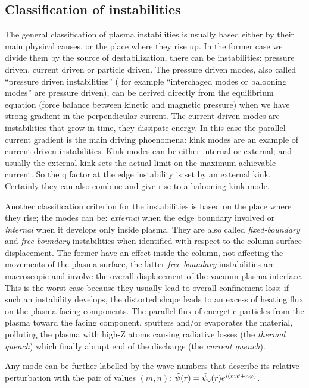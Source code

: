 \subsection{Classification of instabilities}
\label{sez:classificazione}

The general classification of plasma instabilities is usually based either by their main physical causes, or the place where they rise up.
%
In the former case we divide them by the source of destabilization, there can be instabilities: pressure driven, current driven or particle driven. 
The pressure driven modes, also called “pressure driven instabilities” ( for example “interchaged modes or balooning modes” are pressure driven), can be derived directly from the equilibrium equation (force balance between kinetic and magnetic pressure) when we have strong gradient in the perpendicular current.
The current driven modes are instabilities that grow in time, they dissipate energy. In this case the parallel current gradient is the main driving phoenomena: kink modes are an example of current driven instabilities. Kink modes can be either internal or external; and usually the external kink sets the actual limit on the maximum achievable current. So the q factor at the edge instability is set by an external kink. Certainly they can also combine and give rise to a balooning-kink mode.

Another classification criterion for the instabilities is based on the place where they rise; the modes can be: \emph{external} when the edge boundary involved or \emph{internal} when it develops only inside plasma. 
They are also called \emph{fixed-boundary} and \emph{free boundary} instabilities when identified with respect to the column surface displacement. The former have an effect inside the column, not affecting the movements of the plasma surface, the latter \emph{free boundary} instabilities are macroscopic and involve the overall displacement of the vacuum-plasma interface.
This is the worst case because they usually lead to overall confinement loss: if such an instability develops, the distorted shape leads to an excess of heating flux on the plasma facing components. The parallel flux of energetic particles from the plasma toward the facing component, sputters and/or evaporates the material, polluting the plasma with high-Z atoms causing  radiative losses (the \emph{thermal quench}) which finally abrupt end of the discharge (the \emph{current quench}).

Any mode can be further labelled by the wave numbers that describe its relative perturbation
with the pair of values $(m, n)$:
$\tilde{\psi}(\Vec{r}) =
\Tilde{\psi}_0(r)e^{i(m\vartheta+n\varphi)}$.

